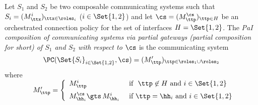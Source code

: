 \begin{definition}
\label{def:comppgw} 
Let $S_1$ and $S_2$ be two composable communicating systems
such that $S_i=(M^i_{\ttx})_{\ttx\in\roles_i}$ ($i\in\Set{1,2}$)
and let  $\cs=(M^\cs_{\ttp})_{\ttp\in H}$  
 be an orchestrated connection policy for the set of interfaces $H=\Set{1,2}$. 
The {\em PaI composition of communicating systems via partial gateways  
(partial composition for short) of 
 $S_1$ and $S_2$ with respect to $\cs$} is the communicating system 
$$\PC(\Set{S_i}_{i\in \Set{1,2}}, \cs) =  (M'_\ttp)_{\ttp\in\roles_1\cup\roles_2}$$
where\\
${\qquad\qquad}M'_\ttp = \left\{ \begin{array}{ll}
                          M^i_\ttp 
                                    &  \text{ if }\ \ttp\not\in H \text{ and } i\in\Set{1,2}
                          \\[2mm]
                          M^\cs_{\hh_i}{\gts\,}M^i_{\hh_i} & \text{ if } \ttp=\hh_i \text{ and $i\in \Set{1,2}$}
                           \end{array}
                 \right.$
\end{definition}






